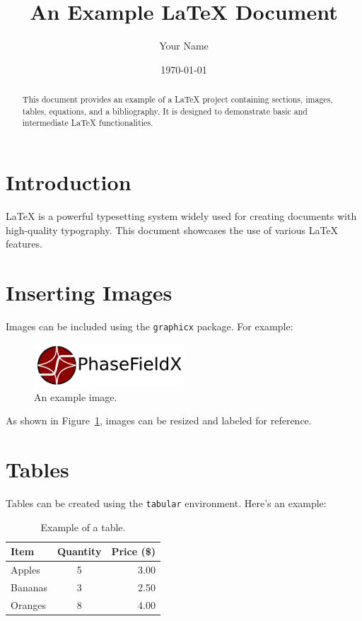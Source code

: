 \documentclass[a4paper,12pt]{article}
\title{An Example LaTeX Document}
\author{Your Name}
\date{\today}
\begin{document}
\maketitle

\begin{abstract}
This document provides an example of a LaTeX project containing sections, images, tables, equations, and a bibliography. It is designed to demonstrate basic and intermediate LaTeX functionalities.
\end{abstract}

\tableofcontents
\newpage

\section{Introduction}
LaTeX is a powerful typesetting system widely used for creating documents with high-quality typography. This document showcases the use of various LaTeX features.

\section{Inserting Images}
Images can be included using the \texttt{graphicx} package. For example:

\begin{figure}[h!]
    \centering
    \includegraphics[width=0.5\textwidth]{images/logo_name.png} %
    \caption{An example image.}
    \label{fig:example-image}
\end{figure}

As shown in Figure~\ref{fig:example-image}, images can be resized and labeled for reference.

\section{Tables}
Tables can be created using the \texttt{tabular} environment. Here's an example:

\begin{table}[h!]
    \centering
    \begin{tabular}{|l|c|r|}
    \hline
    \textbf{Item} & \textbf{Quantity} & \textbf{Price (\$)} \\ \hline
    Apples        & 5                 & 3.00               \\ \hline
    Bananas       & 3                 & 2.50               \\ \hline
    Oranges       & 8                 & 4.00               \\ \hline
    \end{tabular}
    \caption{Example of a table.}
    \label{tab:example-table}
\end{table}
\end{document}
